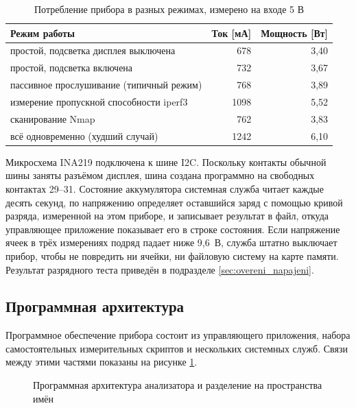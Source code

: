 \begin{table}[htbp]
    \caption{Потребление прибора в разных режимах, измерено на входе 5 В}
    \label{tab:spotreba}
    \centering
    \begin{tabular}{lrr}
        \hline
        Режим работы & Ток [мА] & Мощность [Вт] \\
        \hline
        простой, подсветка дисплея выключена & 678 & 3,40 \\
        простой, подсветка включена & 732 & 3,67 \\
        пассивное прослушивание (типичный режим) & 768 & 3,89 \\
        измерение пропускной способности iperf3 & 1098 & 5,52 \\
        сканирование Nmap & 762 & 3,83 \\
        всё одновременно (худший случай) & 1242 & 6,10 \\
        \hline
    \end{tabular}
\end{table}

Микросхема INA219 подключена к шине I2C. Поскольку контакты обычной шины заняты разъёмом дисплея, шина создана программно на свободных контактах 29--31. Состояние аккумулятора системная служба читает каждые десять секунд, по напряжению определяет оставшийся заряд с помощью кривой разряда, измеренной на этом приборе, и записывает результат в файл, откуда управляющее приложение показывает его в строке состояния. Если напряжение ячеек в трёх измерениях подряд падает ниже 9,6~В, служба штатно выключает прибор, чтобы не повредить ни ячейки, ни файловую систему на карте памяти. Результат разрядного теста приведён в подразделе \ref{sec:overeni_napajeni}.

\subsection{Программная архитектура}
\label{sec:architektura}

Программное обеспечение прибора состоит из управляющего приложения, набора самостоятельных измерительных скриптов и нескольких системных служб. Связи между этими частями показаны на рисунке \ref{fig:architektura}.

\begin{figure}[htbp]
    \centering
    
    \caption{Программная архитектура анализатора и разделение на пространства имён}
    \label{fig:architektura}
\end{figure}

